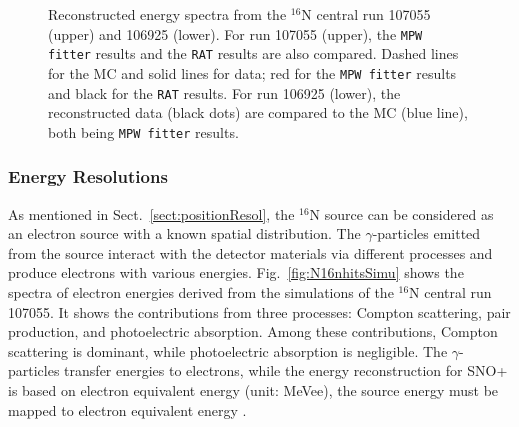 \begin{figure}[htbp]
	\centering
	\caption[Reconstructed energy spectra from the $^{16}$N central run 107055 and 106925.]{Reconstructed energy spectra from the $^{16}$N central run 107055 (upper) and 106925 (lower). For run 107055 (upper), the \texttt{MPW fitter} results and the \texttt{RAT} results are also compared. Dashed lines for the MC and solid lines for data; red for the \texttt{MPW fitter} results and black for the \texttt{RAT} results. For run 106925 (lower), the reconstructed data (black dots) are compared to the MC (blue line), both being \texttt{MPW fitter} results.\label{fig:N16energy}}
\end{figure}

\subsubsection{Energy Resolutions}
As mentioned in Sect.~\ref{sect:positionResol}, the $^{16}$N source can be considered as an electron source with a known spatial distribution. The $\gamma$-particles emitted from the source interact with the detector materials via different processes and produce electrons with various energies. Fig.~\ref{fig:N16nhitsSimu} shows the spectra of electron energies derived from the simulations of the $^{16}$N central run 107055. It shows the contributions from three processes: Compton scattering, pair production, and photoelectric absorption. Among these contributions, Compton scattering is dominant, while photoelectric absorption is negligible. The $\gamma$-particles transfer energies to electrons, while the energy reconstruction for SNO+ is based on electron equivalent energy (unit: MeVee), the source energy must be mapped to electron equivalent energy \cite{morganThesis}. 

